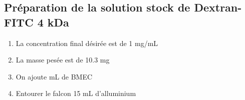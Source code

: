 \subsection{Préparation de la solution stock de Dextran-FITC 4 kDa}

\begin{enumerate}
\item La concentration final désirée est de 1 mg/mL
\item La masse pesée est de 10.3 mg 
\item On ajoute  mL de BMEC
\item Entourer le falcon 15 mL d'alluminium
\end{enumerate}